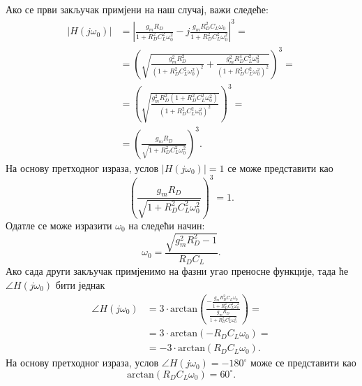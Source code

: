 \documentclass[master]{finthesis}
\begin{document}
Ако се први закључак примјени на наш случај, важи следеће:
\begin{equation} 
	\label{osc_feedback_eq_12}
	\displaystyle
	\begin{split}
		|H(j\omega_{0})| &= \left|\frac{g_{m}R_{D}}{1+R_{D}^{2}C_{L}^{2}\omega_{0}^2}-j\frac{g_{m}R_{D}^{2}C_{L}\omega_{0}}{1+R_{D}^{2}C_{L}^{2}\omega_{0}^{2}}\right|^{3} = \\
				 &= \left(\sqrt{\frac{g_{m}^{2}R_{D}^{2}}{(1+R_{D}^{2}C_{L}^{2}\omega_{0}^{2})^{2}}+\frac{g_{m}^{2}R_{D}^{4}C_{L}^{2}\omega_{0}^{2}}{(1+R_{D}^{2}C_{L}^{2}\omega_{0}^{2})^{2}}}\right)^{3} = \\
				 &= \left(\sqrt{\frac{g_{m}^{2}R_{D}^{2}(1+R_{D}^{2}C_{L}^{2}\omega_{0}^{2})}{(1+R_{D}^{2}C_{L}^{2}\omega_{0}^{2})^{2}}}\right)^{3} = \\
				 &= \left(\frac{g_{m}R_{D}}{\sqrt{1+R_{D}^{2}C_{L}^{2}\omega_{0}^{2}}}\right)^{3}.
	\end{split}
\end{equation}
На основу претходног израза, услов $|H(j\omega_{0})|=1$ се може представити као
\begin{equation}
	\label{osc_feedback_eq_13}
	\displaystyle
	\left(\frac{g_{m}R_{D}}{\sqrt{1+R_{D}^{2}C_{L}^{2}\omega_{0}^{2}}}\right)^{3} = 1.
\end{equation}
Одатле се може изразити $\omega_{0}$ на следећи начин:
\begin{equation}
	\label{osc_feedback_eq_14}
	\displaystyle
	\omega_{0} = \frac{\sqrt{g_{m}^{2}R_{D}^{2}-1}}{R_{D}C_{L}}.
\end{equation}
Ако сада други закључак примјенимо на фазни угао преносне функције, тада ће $\angle H(j\omega_{0})$ бити једнак
\begin{equation}
	\label{osc_feedback_eq_15}
	\displaystyle
	\begin{split}
		\angle H(j\omega_{0}) &= 3\cdot\text{arctan}\left(\frac{\displaystyle -\frac{g_{m}R_{D}^{2}C_{L}\omega_{0}}{1+R_{D}^{2}C_{L}^{2}\omega_{0}^2}}{\displaystyle \frac{g_{m}R_{D}}{1+R_{D}^{2}C_{L}^{2}\omega_{0}^2}}\right) = \\
				     &= 3\cdot\text{arctan}(-R_{D}C_{L}\omega_{0}) = \\
				     &= -3\cdot\text{arctan}(R_{D}C_{L}\omega_{0}).
	\end{split}
\end{equation}
На основу претходног израза, услов $\angle H(j\omega_{0}) = -180^{\circ}$ може се представити као
\begin{equation}
	\label{osc_feedback_eq_16}
	\displaystyle
	\text{arctan}(R_{D}C_{L}\omega_{0}) = 60^{\circ}.
\end{equation}
\end{document}
